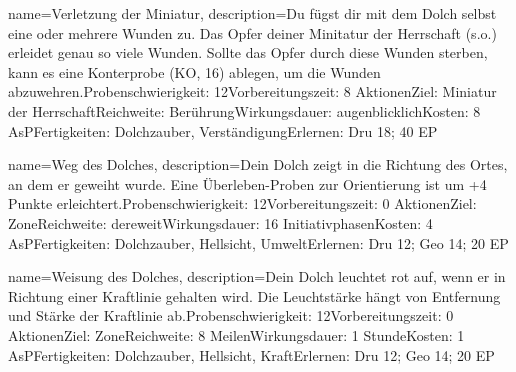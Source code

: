 {
    name={Verletzung der Miniatur},
    description={Du fügst dir mit dem Dolch selbst eine oder mehrere Wunden zu. Das Opfer deiner Minitatur der Herrschaft (s.o.) erleidet genau so viele Wunden. Sollte das Opfer durch diese Wunden sterben, kann es eine Konterprobe (KO, 16) ablegen, um die Wunden abzuwehren.\newline Probenschwierigkeit: 12\newline Vorbereitungszeit: 8 Aktionen\newline Ziel: Miniatur der Herrschaft\newline Reichweite: Berührung\newline Wirkungsdauer: augenblicklich\newline Kosten: 8 AsP\newline Fertigkeiten: Dolchzauber, Verständigung\newline Erlernen: Dru 18; 40 EP}
}


{
    name={Weg des Dolches},
    description={Dein Dolch zeigt in die Richtung des Ortes, an dem er geweiht wurde.  Eine Überleben-Proben zur Orientierung ist um +4 Punkte erleichtert.\newline Probenschwierigkeit: 12\newline Vorbereitungszeit: 0 Aktionen\newline Ziel: Zone\newline Reichweite: dereweit\newline Wirkungsdauer: 16 Initiativphasen\newline Kosten: 4 AsP\newline Fertigkeiten: Dolchzauber, Hellsicht, Umwelt\newline Erlernen: Dru 12; Geo 14; 20 EP}
}


{
    name={Weisung des Dolches},
    description={Dein Dolch leuchtet rot auf, wenn er in Richtung einer Kraftlinie gehalten wird. Die Leuchtstärke hängt von Entfernung und Stärke der Kraftlinie ab.\newline Probenschwierigkeit: 12\newline Vorbereitungszeit: 0 Aktionen\newline Ziel: Zone\newline Reichweite: 8 Meilen\newline Wirkungsdauer: 1 Stunde\newline Kosten: 1 AsP\newline Fertigkeiten: Dolchzauber, Hellsicht, Kraft\newline Erlernen: Dru 12; Geo 14; 20 EP}
}


